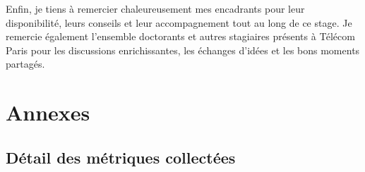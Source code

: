 \documentclass[12pt, a4paper]{report}
\begin{document}
	Enfin, je tiens à remercier chaleureusement mes encadrants pour leur disponibilité, leurs conseils et leur accompagnement tout au long de ce stage. Je remercie également l'ensemble doctorants et autres stagiaires présents à Télécom Paris pour les discussions enrichissantes, les échanges d'idées et les bons moments partagés. 



	\nocite{*}
	\printbibliography




	\chapter*{Annexes} \label{annexes}
	
	\section*{Détail des métriques collectées}
	\label{annexe:metrics}
	
\end{document}
